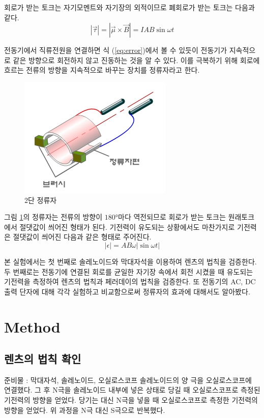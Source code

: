 \documentclass[a4paper]{article}
\begin{document}
	회로가 받는 토크는 자기모멘트와 자기장의 외적이므로 폐회로가 받는 토크는 다음과 같다.
	\begin{equation}
		|\vec{\tau}| = |\vec{\mu} \times \vec{B}| = IAB\sin{\omega{}t}
		\label{eq:error}
	\end{equation}

 	전동기에서 직류전원을 연결하면 식 (\ref{eq:error})에서 볼 수 있듯이 전동기가 지속적으로 같은 방향으로 회전하지 않고 진동하는 것을 알 수 있다.
 	이를 극복하기 위해 회로에 흐르는 전류의 방향을 지속적으로 바꾸는 장치를 정류자라고 한다.
 	\begin{figure}[h]   		
 		\centering
 		\includegraphics[scale=0.5]{img/a-5385.jpg}
 		\caption{2단 정류자}
   		\label{fig:com}
 	\end{figure}

 	그림 \ref{fig:com}의 정류자는 전류의 방향이 $\ang{180;;}$마다 역전되므로 회로가 받는 토크는 원래토크에서 절댓값이 씌어진 형태가 된다.
 	기전력이 유도되는 상황에서도 마찬가지로 기전력은 절댓값이 씌어진 다음과 같은 형태로 주어진다.
 	\begin{equation}
 		|\epsilon| = AB\omega{}|\sin{\omega t}|
 		\label{eq:commnute}
 	\end{equation}

 	본 실험에서는 첫 번째로 솔레노이드와 막대자석을 이용하여 렌츠의 법칙을 검증한다.
 	두 번째로는 전동기에 연결된 회로를 균일한 자기장 속에서 회전 시켰을 때 유도되는 기전력을 측정하여 렌츠의 법칙과 페러데이의 법칙을 검증한다.
 	또 전동기의 AC, DC출력 단자에 대해 각각 실험하고 비교함으로써 정류자의 효과에 대해서도 알아봤다.

	\section{Method}
	\subsection{렌츠의 법칙 확인}
	준비물 : 막대자석, 솔레노이드, 오실로스코프
	솔레노이드의 양 극을 오실로스코프에 연결했다. 
	그 후 N극을 솔레노이드 내부에 넣은 상태로 당길 때 오실로스코프로 측정된 기전력의 방향을 얻었다.
	당기는 대신 N극을 넣을 때 오실로스코프로 측정한 기전력의 방향을 얻었다.
	위 과정을 N극 대신 S극으로 반복했다.
\end{document}
